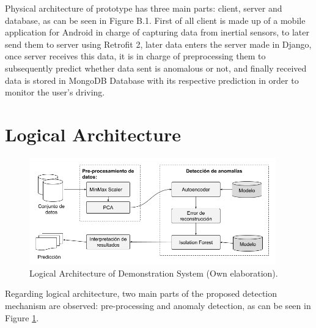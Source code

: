 Physical architecture of prototype has three main parts: client, server and database, as can be seen in Figure B.1. First of all client is made up of a mobile application for Android in charge of capturing data from inertial sensors, to later send them to server using Retrofit 2, later data enters the server made in Django, once server receives this data, it is in charge of preprocessing them to subsequently predict whether data sent is anomalous or not, and finally received data is stored in MongoDB Database with its respective prediction in order to monitor the user's driving.

\section{Logical Architecture} 

\begin{figure}[h!]
  \begin{center}	\includegraphics[width=0.95\textwidth, fbox]{imagenes/Apendices/arquitectura_logica}
  \caption{Logical Architecture of Demonstration System (Own elaboration).}
  \label{fig:arq_log}  
  \end{center}
\end{figure}

Regarding logical architecture, two main parts of the proposed detection mechanism are observed: pre-processing and anomaly detection, as can be seen in Figure \ref{fig:arq_log}.
